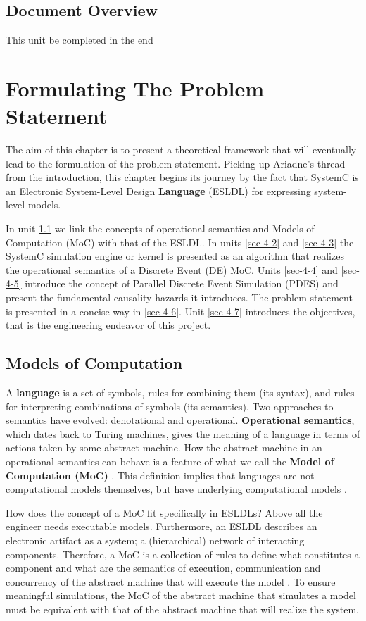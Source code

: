 \documentclass[12pt,twoside]{article}
\begin{document}
\subsection{Document Overview}
\label{sec-3-6}
This unit be completed in the end
\clearpage



\section{Formulating The Problem Statement}
\label{sec-4}
The aim of this chapter is to present a theoretical framework that will eventually lead to the formulation of the problem statement.
Picking up Ariadne's thread from the introduction, this chapter begins its journey by the fact that SystemC is an Electronic System-Level Design \textbf{Language} (ESLDL) for expressing system-level models.

In unit \ref{sec-4-1} we link the concepts of operational semantics and Models of Computation (MoC) with that of the ESLDL.
In units \ref{sec-4-2} and \ref{sec-4-3} the SystemC simulation engine or kernel is presented as an algorithm that realizes the operational semantics of a Discrete Event (DE) MoC.
Units \ref{sec-4-4} and \ref{sec-4-5} introduce the concept of Parallel Discrete Event Simulation (PDES) and present the fundamental causality hazards it introduces.
The problem statement is presented in a concise way in \ref{sec-4-6}.
Unit \ref{sec-4-7} introduces the objectives, that is the engineering endeavor of this project.

\subsection{Models of Computation}
\label{sec-4-1}
A \textbf{language} is a set of symbols, rules for combining them (its syntax), and rules for interpreting combinations of symbols (its semantics). 
Two approaches to semantics have evolved: denotational and operational.
\textbf{Operational semantics}, which dates back to Turing machines, gives the meaning of a language in terms of actions taken by some abstract machine. 
How the abstract machine in an operational semantics can behave is a feature of what we call the \textbf{Model of Computation (MoC)} \cite{Edwards1997}.
This definition implies that languages are not computational models themselves, but have underlying computational models \cite{Jantsch2005}.

How does the concept of a MoC fit specifically in ESLDLs?
Above all the engineer needs executable models.
Furthermore, an ESLDL describes an electronic artifact as a system; a (hierarchical) network of interacting components.
Therefore, a MoC is a collection of rules to define what constitutes a component and what are the semantics of execution, communication and concurrency of the abstract machine that will execute the model \cite{Jantsch2005} \cite{Editor2014}.
To ensure meaningful simulations, the MoC of the abstract machine that simulates a model must be equivalent with that of the abstract machine that will realize the system.
\end{document}
